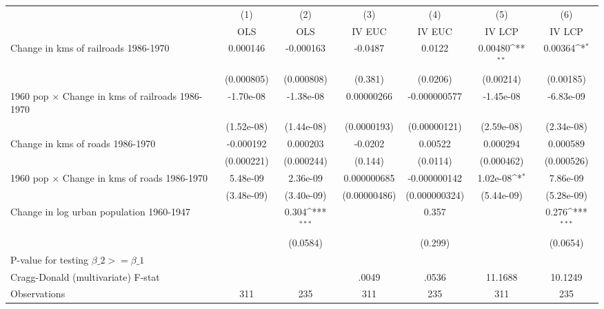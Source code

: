{
\def\sym#1{\ifmmode^{#1}\else\(^{#1}\)\fi}
\begin{tabular}{l*{6}{c}}
\hline\hline
                &\multicolumn{1}{c}{(1)}&\multicolumn{1}{c}{(2)}&\multicolumn{1}{c}{(3)}&\multicolumn{1}{c}{(4)}&\multicolumn{1}{c}{(5)}&\multicolumn{1}{c}{(6)}\\
                &\multicolumn{1}{c}{OLS}&\multicolumn{1}{c}{OLS}&\multicolumn{1}{c}{IV EUC}&\multicolumn{1}{c}{IV EUC}&\multicolumn{1}{c}{IV LCP}&\multicolumn{1}{c}{IV LCP}\\
\hline
Change in kms of railroads 1986-1970& 0.000146         &-0.000163         &  -0.0487         &   0.0122         &  0.00480\sym{**} &  0.00364\sym{*}  \\
                &(0.000805)         &(0.000808)         &  (0.381)         & (0.0206)         &(0.00214)         &(0.00185)         \\
[1em]
1960 pop $\times$ Change in kms of railroads 1986-1970&-1.70e-08         &-1.38e-08         &0.00000266         &-0.000000577         &-1.45e-08         &-6.83e-09         \\
                &(1.52e-08)         &(1.44e-08)         &(0.0000193)         &(0.00000121)         &(2.59e-08)         &(2.34e-08)         \\
[1em]
Change in kms of roads 1986-1970&-0.000192         & 0.000203         &  -0.0202         &  0.00522         & 0.000294         & 0.000589         \\
                &(0.000221)         &(0.000244)         &  (0.144)         & (0.0114)         &(0.000462)         &(0.000526)         \\
[1em]
1960 pop $\times$ Change in kms of roads 1986-1970& 5.48e-09         & 2.36e-09         &0.000000685         &-0.000000142         & 1.02e-08\sym{*}  & 7.86e-09         \\
                &(3.48e-09)         &(3.40e-09)         &(0.00000486)         &(0.000000324)         &(5.44e-09)         &(5.28e-09)         \\
[1em]
Change in log urban population 1960-1947&                  &    0.304\sym{***}&                  &    0.357         &                  &    0.276\sym{***}\\
                &                  & (0.0584)         &                  &  (0.299)         &                  & (0.0654)         \\
\hline
P-value for testing $\beta\_{2} >= \beta\_{1}$&                  &                  &                  &                  &                  &                  \\
Cragg-Donald (multivariate) F-stat&                  &                  &    .0049         &    .0536         &  11.1688         &  10.1249         \\
Observations    &      311         &      235         &      311         &      235         &      311         &      235         \\
\hline\hline
\end{tabular}
}
